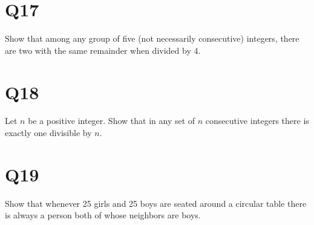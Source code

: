 \documentclass[11pt]{article}
\begin{document}
\section*{Q17}
Show that among any group of ﬁve (not necessarily consecutive) integers, there are two with the same remainder when divided by 4.

\section*{Q18}
Let $n$ be a positive integer. Show that in any set of $n$ consecutive integers there is exactly one divisible by $n$.

\section*{Q19}
Show that whenever 25 girls and 25 boys are seated around a circular table there is always a person both of whose neighbors are boys.
\end{document}
